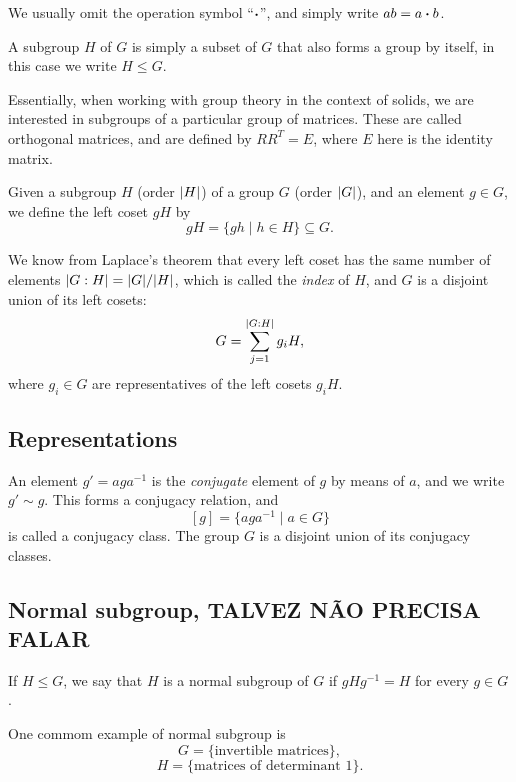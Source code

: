 We usually omit the operation symbol ``$\vdot$'', and simply write $ab = a \vdot b$.

A subgroup $H$ of $G$ is simply a subset of $G$ that also forms a group by itself, in this case we write $H \leq G$.

Essentially, when working with group theory in the context of solids, we are interested in subgroups of a particular group of matrices. These are called orthogonal matrices, and are defined by $R R^T = E$, where $E$ here is the identity matrix.

\n\n\n

Given a subgroup $H$ (order $\abs{H}$) of a group $G$ (order $\abs{G}$), and an element $g \in G$, we define the left coset $gH$ by
$$
gH = \{gh \mid h \in H\} \subseteq G.
$$

We know from Laplace's theorem that every left coset has the same number of elements $\abs{G:H} = \abs{G} / \abs{H}$, which is called the \textit{index} of $H$, and $G$ is a disjoint union of its left cosets:
$$
G = \sum_{j=1}^{\abs{G:H}} g_i H,
$$
where $g_i \in G$ are representatives of the left cosets $g_i H$.

\subsection{Representations}

An element $g' = a g a^{-1}$ is the \textit{conjugate} element of $g$ by means of $a$, and we write $g' \sim g$. This forms a conjugacy relation, and
$$
[g] = \{a g a^{-1} \mid a \in G\}
$$
is called a conjugacy class. The group $G$ is a disjoint union of its conjugacy classes.

\subsection{Normal subgroup, TALVEZ NÃO PRECISA FALAR}

If $H \leq G$, we say that $H$ is a normal subgroup of $G$ if $g H g^{-1} = H$ for every $g \in G$.

One commom example of normal subgroup is
$$
G = \{ \text{invertible matrices} \},
$$
$$
H = \{ \text{matrices of determinant 1} \}.
$$

